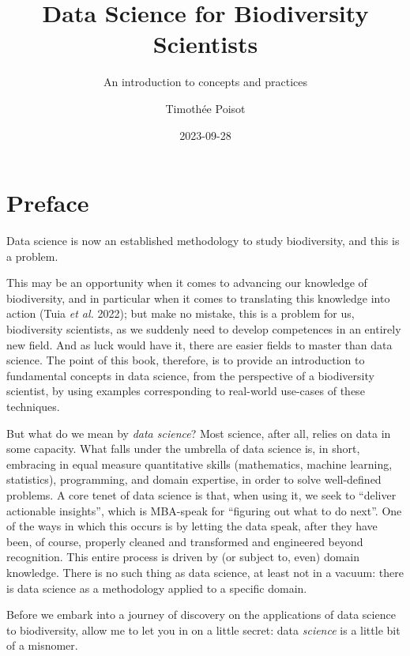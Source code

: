 \documentclass[
  letterpaper,
]{scrbook}
\title{Data Science for Biodiversity Scientists}
\subtitle{An introduction to concepts and practices}
\author{Timothée Poisot}
\date{2023-09-28}
\renewcommand*\contentsname{Table of contents}
\newcommand\contentsname{Table of contents}
\begin{document}
\frontmatter
\maketitle
\renewcommand*\contentsname{Table of contents}
{
\hypersetup{linkcolor=}
\setcounter{tocdepth}{1}
\tableofcontents
}
\mainmatter
{}

\chapter*{Preface}\label{preface}


Data science is now an established methodology to study biodiversity,
and this is a problem.

This may be an opportunity when it comes to advancing our knowledge of
biodiversity, and in particular when it comes to translating this
knowledge into action (Tuia \emph{et al.} 2022); but make no mistake,
this is a problem for us, biodiversity scientists, as we suddenly need
to develop competences in an entirely new field. And as luck would have
it, there are easier fields to master than data science. The point of
this book, therefore, is to provide an introduction to fundamental
concepts in data science, from the perspective of a biodiversity
scientist, by using examples corresponding to real-world use-cases of
these techniques.

But what do we mean by \emph{data science}? Most science, after all,
relies on data in some capacity. What falls under the umbrella of data
science is, in short, embracing in equal measure quantitative skills
(mathematics, machine learning, statistics), programming, and domain
expertise, in order to solve well-defined problems. A core tenet of data
science is that, when using it, we seek to ``deliver actionable
insights'', which is MBA-speak for ``figuring out what to do next''. One
of the ways in which this occurs is by letting the data speak, after
they have been, of course, properly cleaned and transformed and
engineered beyond recognition. This entire process is driven by (or
subject to, even) domain knowledge. There is no such thing as data
science, at least not in a vacuum: there is data science as a
methodology applied to a specific domain.

Before we embark into a journey of discovery on the applications of data
science to biodiversity, allow me to let you in on a little secret: data
\emph{science} is a little bit of a misnomer.
\end{document}
